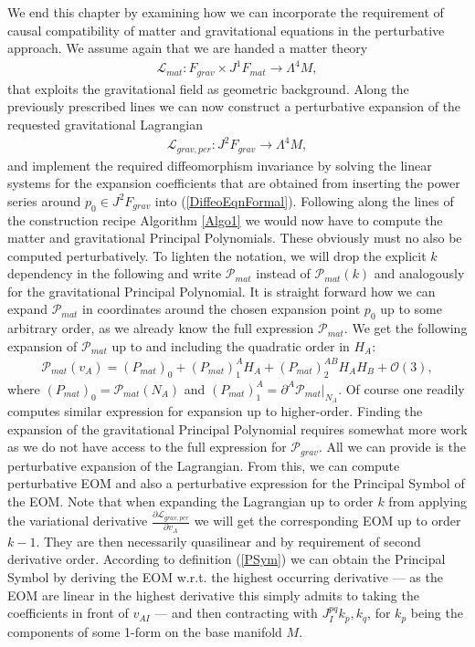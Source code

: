 We end this chapter by examining how we can incorporate the requirement of causal compatibility of matter and gravitational equations in the perturbative approach.
We assume again that we are handed a matter theory 
\begin{align}
    \mathcal{L}_{mat} : F_{grav} \times J^1F_{mat} \longrightarrow \Lambda^4M,
\end{align}
that exploits the gravitational field as geometric background. Along the previously prescribed lines we can now construct a perturbative expansion of the requested gravitational Lagrangian
\begin{align}
    \mathcal{L}_{grav,per} : J^2F_{grav} \longrightarrow \Lambda^4M,
\end{align}
and implement the required diffeomorphism invariance by solving the linear systems for the expansion coefficients that are obtained from inserting the power series around $p_0 \in J^2F_{grav}$ into (\ref{DiffeoEqnFormal}). 
Following along the lines of the construction recipe Algorithm \ref{Algo1} we would now have to compute the matter and gravitational Principal Polynomials.
These obviously must no also be computed perturbatively. 
To lighten the notation, we will drop the explicit $k$ dependency in the following and write $\mathcal{P}_{mat}$ instead of $\mathcal{P}_{mat}(k)$ and analogously for the gravitational Principal Polynomial. It is straight forward how we can expand $\mathcal{P}_{mat}$ in coordinates around the chosen expansion point $p_0$ up to some arbitrary order, as we already know the full expression $\mathcal{P}_{mat}$. We get the following expansion of $\mathcal{P}_{mat}$ up to and including the quadratic order in $H_A$:
\begin{align}
    \mathcal{P}_{mat}(v_A) = (P_{mat})_{0} + (P_{mat})^A_1 H_A+ (P_{mat})^{AB}_2 H_A H_B +\mathcal{O}(3),
\end{align}
where $(P_{mat})_0 = \mathcal{P}_{mat}(N_A)$ and $(P_{mat})_1^A = \partial^A \mathcal{P}_{mat} \vert _{N_A}$. Of course one readily computes similar expression for expansion up to higher-order. 
Finding the expansion of the gravitational Principal Polynomial requires somewhat more work as we do not have access to the full expression for $\mathcal{P}_{grav}$. All we can provide is the perturbative expansion of the Lagrangian. From this, we can compute perturbative EOM and also a perturbative expression for the Principal Symbol of the EOM.
Note that when expanding the Lagrangian up to order $k$ from applying the variational derivative $\frac{\partial\mathcal L_{grav,per}}{\partial v_A}$ we will get the corresponding EOM up to order $k-1$. They are then necessarily quasilinear and by requirement of second derivative order. According to definition (\ref{PSym}) we can obtain the Principal Symbol by deriving the EOM w.r.t. the highest occurring derivative  --- as the EOM are linear in the highest derivative this simply admits to taking the coefficients in front of $v_{AI}$ --- and then contracting with $J_I^{pq} k_p, k_q$, for $k_p$ being the components of some 1-form on the base manifold $M$. 
